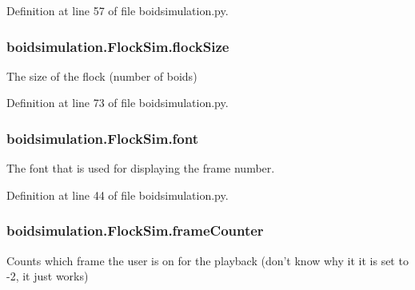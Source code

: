 Definition at line 57 of file boidsimulation.\-py.

\hypertarget{classboidsimulation_1_1FlockSim_a125fa6c2909527f18c768f09606ab442}{
\subsubsection[{flock\-Size}]{\setlength{\rightskip}{0pt plus 5cm}boidsimulation.\-Flock\-Sim.\-flock\-Size}}\label{classboidsimulation_1_1FlockSim_a125fa6c2909527f18c768f09606ab442}


The size of the flock (number of boids) 



Definition at line 73 of file boidsimulation.\-py.

\hypertarget{classboidsimulation_1_1FlockSim_aa5993f8033dcbbb0383c204877d1dd20}{
\subsubsection[{font}]{\setlength{\rightskip}{0pt plus 5cm}boidsimulation.\-Flock\-Sim.\-font}}\label{classboidsimulation_1_1FlockSim_aa5993f8033dcbbb0383c204877d1dd20}


The font that is used for displaying the frame number. 



Definition at line 44 of file boidsimulation.\-py.

\hypertarget{classboidsimulation_1_1FlockSim_a7daba8b4e771dcd6f6a7357bda59c56a}{
\subsubsection[{frame\-Counter}]{\setlength{\rightskip}{0pt plus 5cm}boidsimulation.\-Flock\-Sim.\-frame\-Counter}}\label{classboidsimulation_1_1FlockSim_a7daba8b4e771dcd6f6a7357bda59c56a}


Counts which frame the user is on for the playback (don't know why it it is set to -\/2, it just works) 




